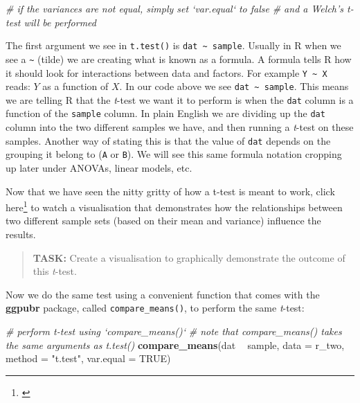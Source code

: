 \documentclass[english,10pt,a4paper,oneside]{book}
\renewcommand{\href}[2]{#2\footnote{\url{#1}}}
\let\rmarkdownfootnote\footnote%
\def\footnote{\protect\rmarkdownfootnote}
\newenvironment{Shaded}{\begin{snugshade}}{\end{snugshade}}
\newcommand{\KeywordTok}[1]{\textcolor[rgb]{0.13,0.29,0.53}{\textbf{#1}}}
\newcommand{\DataTypeTok}[1]{\textcolor[rgb]{0.13,0.29,0.53}{#1}}
\newcommand{\StringTok}[1]{\textcolor[rgb]{0.31,0.60,0.02}{#1}}
\newcommand{\CommentTok}[1]{\textcolor[rgb]{0.56,0.35,0.01}{\textit{#1}}}
\newcommand{\OtherTok}[1]{\textcolor[rgb]{0.56,0.35,0.01}{#1}}
\newcommand{\OperatorTok}[1]{\textcolor[rgb]{0.81,0.36,0.00}{\textbf{#1}}}
\newcommand{\NormalTok}[1]{#1}
\theoremstyle{definition}
\theoremstyle{definition}
\theoremstyle{definition}
\theoremstyle{remark}
\begin{document}
\begin{Shaded}
\begin{Highlighting}[]
\CommentTok{# if the variances are not equal, simply set `var.equal` to false}
\CommentTok{# and a Welch's t-test will be performed}
\end{Highlighting}
\end{Shaded}

The first argument we see in \texttt{t.test()} is
\texttt{dat\ \textasciitilde{}\ sample}. Usually in R when we see a
\texttt{\textasciitilde{}} (tilde) we are creating what is known as a
formula. A formula tells R how it should look for interactions between
data and factors. For example \texttt{Y\ \textasciitilde{}\ X} reads:
\(Y\) as a function of \(X\). In our code above we see
\texttt{dat\ \textasciitilde{}\ sample}. This means we are telling R
that the \emph{t}-test we want it to perform is when the \texttt{dat}
column is a function of the \texttt{sample} column. In plain English we
are dividing up the \texttt{dat} column into the two different samples
we have, and then running a \emph{t}-test on these samples. Another way
of stating this is that the value of \texttt{dat} depends on the
grouping it belong to (\texttt{A} or \texttt{B}). We will see this same
formula notation cropping up later under ANOVAs, linear models, etc.

Now that we have seen the nitty gritty of how a t-test is meant to work,
click \href{}{here} to watch a visualisation that demonstrates how the
relationships between two different sample sets (based on their mean and
variance) influence the results.

\begin{quote}
\textbf{TASK:} Create a visualisation to graphically demonstrate the
outcome of this \emph{t}-test.
\end{quote}

Now we do the same test using a convenient function that comes with the
\textbf{ggpubr} package, called \texttt{compare\_means()}, to perform
the same \emph{t}-test:

\begin{Shaded}
\begin{Highlighting}[]
\CommentTok{# perform t-test using `compare_means()`}
\CommentTok{# note that compare_means() takes the same arguments as t.test()}
\KeywordTok{compare_means}\NormalTok{(dat }\OperatorTok{~}\StringTok{ }\NormalTok{sample, }\DataTypeTok{data =}\NormalTok{ r_two, }\DataTypeTok{method =} \StringTok{"t.test"}\NormalTok{, }\DataTypeTok{var.equal =} \OtherTok{TRUE}\NormalTok{)}
\end{Highlighting}
\end{Shaded}
\end{document}
